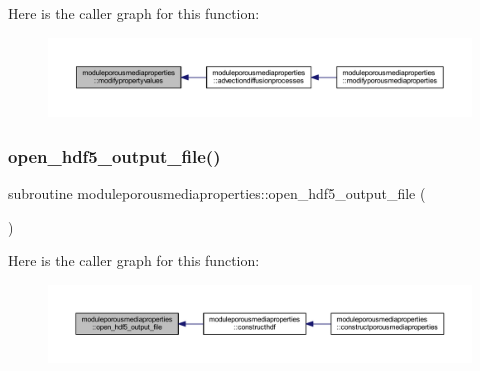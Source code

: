 Here is the caller graph for this function\+:\nopagebreak
\begin{figure}[H]
\begin{center}
\leavevmode
\includegraphics[width=350pt]{namespacemoduleporousmediaproperties_a4a86b3e01bf62024194ec6a00d661a86_icgraph}
\end{center}
\end{figure}
\mbox{\label{namespacemoduleporousmediaproperties_a03262673fc0a9c3eece9a35a7e11e852}} 
\subsubsection{\texorpdfstring{open\+\_\+hdf5\+\_\+output\+\_\+file()}{open\_hdf5\_output\_file()}}
{\footnotesize\ttfamily subroutine moduleporousmediaproperties\+::open\+\_\+hdf5\+\_\+output\+\_\+file (\begin{DoxyParamCaption}{ }\end{DoxyParamCaption})\hspace{0.3cm}{\ttfamily [private]}}

Here is the caller graph for this function\+:\nopagebreak
\begin{figure}[H]
\begin{center}
\leavevmode
\includegraphics[width=350pt]{namespacemoduleporousmediaproperties_a03262673fc0a9c3eece9a35a7e11e852_icgraph}
\end{center}
\end{figure}
\mbox{\label{namespacemoduleporousmediaproperties_a7485615a66ceb16b22cd17c505c048ff}} 
